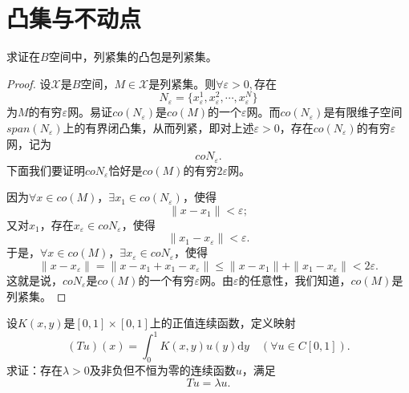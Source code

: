 \section{凸集与不动点}

\begin{exercise}
求证在$B$空间中，列紧集的凸包是列紧集。
\end{exercise}

\begin{proof} 
设$\mathscr{X}$是$B$空间，$M\in\mathscr{X}$是列紧集。则$\forall\varepsilon>0,$存在$$N_{\varepsilon}=\{x_{\varepsilon}^1,x_{\varepsilon}^2,\cdots,x_{\varepsilon}^N\}$$为$M$的有穷$\varepsilon$网。易证$co(N_{\varepsilon})$是$co(M)$的一个$\varepsilon$网。而$co(N_{\varepsilon})$是有限维子空间$span(N_{\varepsilon})$上的有界闭凸集，从而列紧，即对上述$\varepsilon>0$，存在$co(N_{\varepsilon})$的有穷$\varepsilon$网，记为$$coN_{\varepsilon}.$$下面我们要证明$coN_{\varepsilon}$恰好是$co(M)$的有穷$2\varepsilon$网。

因为$\forall x\in co(M)$，$\exists x_1\in co(N_{\varepsilon})$，使得$$\|x-x_1\|<\varepsilon;$$又对$x_1$，存在$x_{\varepsilon}\in coN_{\varepsilon}$，使得$$\|x_1-x_{\varepsilon}\|<\varepsilon.$$
于是，$\forall x\in co(M)$，$\exists x_{\varepsilon}\in coN_{\varepsilon}$，使得
$$\|x-x_{\varepsilon}\|=\|x-x_1+x_1-x_{\varepsilon}\|\leq\|x-x_1\|+\|x_1-x_{\varepsilon}\|<2\varepsilon.$$
这就是说，$coN_\varepsilon$是$co(M)$的一个有穷$\varepsilon$网。由$\varepsilon$的任意性，我们知道，$co(M)$是列紧集。
\end{proof}

\begin{exercise}
设$K(x,y)$是$[0,1]\times[0,1]$上的正值连续函数，定义映射
$$(Tu)(x)=\int_0^1K(x,y)u(y)\mathrm{d}y\quad(\forall u\in C[0,1]).$$
求证：存在$\lambda>0$及非负但不恒为零的连续函数$u$，满足
$$Tu=\lambda u.$$
\end{exercise}

